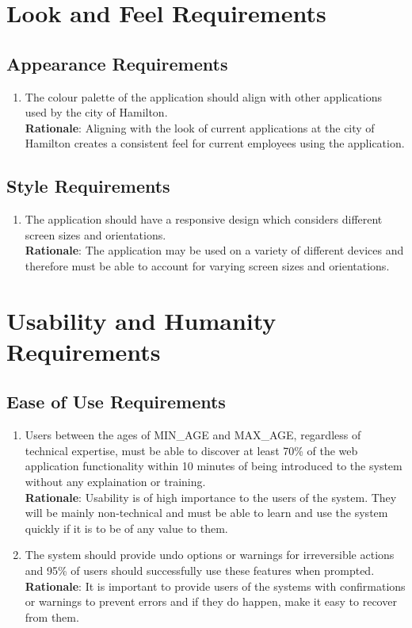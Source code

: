 \documentclass[12pt]{article}
\begin{document}
\section{Look and Feel Requirements}
\subsection{Appearance Requirements}
\begin{enumerate}[{LF-AP}1.]
  \item The colour palette of the application should align with other
    applications used by the city of Hamilton. \\
    \textbf{Rationale}: Aligning with the look of current
    applications at the city of Hamilton creates a consistent feel
    for current employees using the application.
\end{enumerate}
\subsection{Style Requirements}
\begin{enumerate}[{LF-ST}1.]
  \item The application should have a responsive design which
    considers different screen sizes and orientations. \\
    \textbf{Rationale}: The application may be used on a variety of
    different devices and therefore must be able to account for
    varying screen sizes and orientations.
\end{enumerate}

\section{Usability and Humanity Requirements}
\subsection{Ease of Use Requirements}
\begin{enumerate}[{UH-EU}1.]
  \item Users between the ages of {MIN\_AGE} and {MAX\_AGE},
    regardless of technical expertise, must be able to discover at least 70\% of
    the web application functionality within 10 minutes of being introduced to
    the system without any explaination or training.\\
    \textbf{Rationale}: Usability is of high importance to the users
    of the system. They will be mainly non-technical and must be able
    to learn and use the system quickly if it is to be of any value to them.
  \item The system should provide undo options or warnings for
    irreversible actions and 95\% of users should successfully use
    these features when prompted.\\
    \textbf{Rationale}: It is important to provide users of the systems with
    confirmations or warnings to prevent errors and if they do happen, make it
    easy to recover from them.
\end{enumerate}
\end{document}
